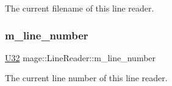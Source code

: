The current filename of this line reader. \hypertarget{classmage_1_1_line_reader_ab145590a7e115106c0987905fde98393}{}\label{classmage_1_1_line_reader_ab145590a7e115106c0987905fde98393} 
\subsubsection{\texorpdfstring{m\+\_\+line\+\_\+number}{m\_line\_number}}
{\footnotesize\ttfamily \hyperlink{namespacemage_a41c104c036fba3756a74e19f793eeaa1}{U32} mage\+::\+Line\+Reader\+::m\+\_\+line\+\_\+number\hspace{0.3cm}{\ttfamily [private]}}

The current line number of this line reader. 